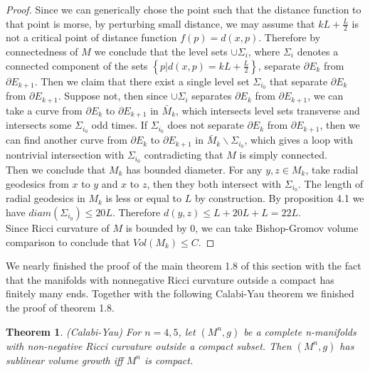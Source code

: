 \documentclass{amsart}
\newtheorem{theorem}{Theorem}[section]
\theoremstyle{definition}
\theoremstyle{remark}
\numberwithin{equation}{section}
\begin{document}
\begin{proof}
    Since we can generically chose the point such that the distance function to that point is morse, by perturbing small distance, we may assume that $kL+\frac{L}{2}$ is not a critical point of distance function $f(p)=d(x,p)$. Therefore by connectedness of $M$ we conclude that the level sets $\cup \Sigma_{i}$, where $\Sigma_{i}$ denotes a connected component of the sets $\left\{p|d(x,p)=kL+\frac{L}{2}\right\}$, separate $\partial E_{k}$ from $\partial E_{k+1}$. Then we claim that there exist a single level set $\Sigma_{i_{0}}$ that separate $\partial E_{k}$ from $\partial E_{k+1}$. Suppose not, then since $\cup \Sigma_{i}$ separates $\partial E_{k}$ from $\partial E_{k+1}$, we can take a curve from $\partial E_{k}$ to $\partial E_{k+1}$ in $\bar{M}_{k}$, which intersects level sets transverse and intersects some $\Sigma_{i_{0}}$ odd times. If $\Sigma_{i_{0}}$ does not separate $\partial E_{k}$ from $\partial E_{k+1}$, then we can find another curve from $\partial E_{k}$ to $\partial E_{k+1}$ in $\bar{M}_{k}\backslash \Sigma_{i_{0}}$, which gives a loop with nontrivial intersection with $\Sigma_{i_{0}}$ contradicting that $M$ is simply connected. \\
   
    Then we conclude that $M_{k}$ has bounded diameter. For any $y,z\in M_{k}$, take radial geodesics from $x$ to $y$ and $x$ to $z$, then they both intersect with $\Sigma_{i_{0}}$. The length of radial geodesics in $M_{k}$ is less or equal to $L$ by construction. By proposition 4.1 we have $diam(\Sigma_{i_{0}})\leq 20L$. Therefore $d(y,z)\leq L+20L+L=22L$.\\

Since Ricci curvature of $M$ is bounded by 0, we can take Bishop-Gromov volume comparison to conclude that $Vol(M_{k})\leq C$. 
    
\end{proof}

We nearly finished the proof of the main theorem 1.8 of this section with the fact that the manifolds with nonnegative Ricci curvature outside a compact has finitely many ends. Together with the following Calabi-Yau theorem we finished the proof of theorem 1.8.

\begin{theorem}(Calabi-Yau)
    For $n=4,5$, let $(M^{n},g)$ be a complete n-manifolds with non-negative Ricci curvature outside a compact subset. Then $(M^{n},g)$ has sublinear volume growth iff $M^{n}$ is compact. 
\end{theorem}
\end{document}
